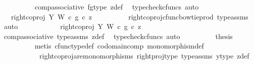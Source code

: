 \begin{isabellebody}
\ \ \ \ \ \ \ \ \isamarkupfalse%
\ comp{\isacharunderscore}{\kern0pt}associative{}\ fg{\isacharunderscore}{\kern0pt}type\ z{\isacharunderscore}{\kern0pt}def\ \isamarkupfalse%
\ {\isacharparenleft}{\kern0pt}typecheck{\isacharunderscore}{\kern0pt}cfuncs{\isacharcomma}{\kern0pt}\ auto{\isacharparenright}{\kern0pt}\isanewline
\ \ \ \ \ \ \isamarkupfalse%
\ \isamarkupfalse%
\ {\isachardoublequoteopen}{\isachardot}{\kern0pt}{\isachardot}{\kern0pt}{\isachardot}{\kern0pt}\ {\isacharequal}{\kern0pt}\ {\isacharparenleft}{\kern0pt}right{\isacharunderscore}{\kern0pt}coproj\ Y\ W\ {\isasymcirc}\isactrlsub c\ g{\isacharparenright}{\kern0pt}\ {\isasymcirc}\isactrlsub c\ z{\isachardoublequoteclose}\isanewline
\ \ \ \ \ \ \ \ \isamarkupfalse%
\ right{\isacharunderscore}{\kern0pt}coproj{\isacharunderscore}{\kern0pt}cfunc{\isacharunderscore}{\kern0pt}bowtie{\isacharunderscore}{\kern0pt}prod\ type{\isacharunderscore}{\kern0pt}assms\ \isamarkupfalse%
\ auto\isanewline
\ \ \ \ \ \ \isamarkupfalse%
\ \isamarkupfalse%
\ {\isachardoublequoteopen}{\isachardot}{\kern0pt}{\isachardot}{\kern0pt}{\isachardot}{\kern0pt}\ {\isacharequal}{\kern0pt}\ right{\isacharunderscore}{\kern0pt}coproj\ Y\ W\ {\isasymcirc}\isactrlsub c\ g\ {\isasymcirc}\isactrlsub c\ z{\isachardoublequoteclose}\isanewline
\ \ \ \ \ \ \ \ \isamarkupfalse%
\ comp{\isacharunderscore}{\kern0pt}associative{}\ type{\isacharunderscore}{\kern0pt}assms{\isacharparenleft}{\kern0pt}{}{\isacharparenright}{\kern0pt}\ z{\isacharunderscore}{\kern0pt}def\ \isamarkupfalse%
\ {\isacharparenleft}{\kern0pt}typecheck{\isacharunderscore}{\kern0pt}cfuncs{\isacharcomma}{\kern0pt}\ auto{\isacharparenright}{\kern0pt}\isanewline
\ \ \ \ \ \ \isamarkupfalse%
\ \isamarkupfalse%
\ {\isacharquery}{\kern0pt}thesis\isanewline
\ \ \ \ \ \ \ \ \isamarkupfalse%
\ {\isacharparenleft}{\kern0pt}metis\ cfunc{\isacharunderscore}{\kern0pt}type{\isacharunderscore}{\kern0pt}def\ codomain{\isacharunderscore}{\kern0pt}comp\ monomorphism{\isacharunderscore}{\kern0pt}def\ \isanewline
\ \ \ \ \ \ \ \ \ \ \ right{\isacharunderscore}{\kern0pt}coproj{\isacharunderscore}{\kern0pt}are{\isacharunderscore}{\kern0pt}monomorphisms\ right{\isacharunderscore}{\kern0pt}proj{\isacharunderscore}{\kern0pt}type\ type{\isacharunderscore}{\kern0pt}assms{\isacharparenleft}{\kern0pt}{}{\isacharparenright}{\kern0pt}\ y{\isacharunderscore}{\kern0pt}type{}\ z{\isacharunderscore}{\kern0pt}def{\isacharparenright}{\kern0pt}\isanewline

\end{isabellebody}
